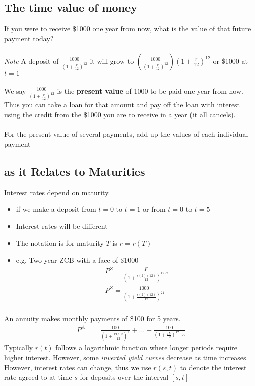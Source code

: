 \documentclass[12pt,letterpaper, twocolumn]{article}
\begin{document}
\subsection{The time value of money}
If you were to receive \$1000 one year from now, what is the value of that future payment today? 
\\\\
\textit{Note} A deposit of $\frac{1000}{(1+\frac{r}{12})^{12}}$ it will grow to $(\frac{1000}{(1+\frac{r}{12})^{12}})(1+\frac{r}{12})^{12}$ or \$1000 at $t=1$
\\\\
We say $\frac{1000}{(1+\frac{r}{12})^{12}}$ is the \textbf{present value} of 1000 to be paid one year from now. Thus you can take a loan for that amount and pay off the loan with interest using the credit from the \$1000 you are to receive in a year (it all cancels). 
\\\\
For the present value of several payments,  add up the values of each individual payment

\subsection{as it Relates to Maturities}
Interest rates depend on maturity. 
\begin{itemize}
    \item if we make a deposit from $t=0$ to $t=1$ or from $t=0$ to $t=5$
    \item Interest rates will be different
    \item The notation is for maturity $T$ is $r=r(T)$
    \item e.g. Two year ZCB with a face of \$1000
    \begin{align*}
        P^{Z} = \frac{F}{(1+\frac{r(2)(12)}{12})^{12\cdot 2}}\\
        P^{Z} = \frac{1000}{(1+\frac{r(2)(12)}{12})^{24}}\\
    \end{align*}
\end{itemize}
An annuity makes monthly payments of \$100 for 5 years. 
\begin{align*}
    P^A&=\frac{100}{(1+\frac{r{1/12}}{12})^1} + \dots + \frac{100}{(1+\frac{r{5}}{12})^12\cdot5}
\end{align*}
Typically $r(t)$ follows a logarithmic function where longer periods require higher interest. However, some \textit{inverted yield curves} decrease as time increases. However, interest rates can change, thus we use $r(s,t)$ to denote the interest rate agreed to at time $s$ for deposits over the interval $[s, t]$
\end{document}
